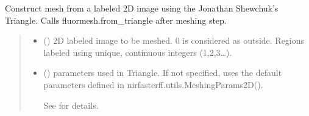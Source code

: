 \documentclass[letterpaper,10pt,english]{sphinxmanual}
\begin{document}
\begin{fulllineitems}
\begin{fulllineitems}
\label{\detokenize{_autosummary/nirfasterff.base.fluor_mesh.fluormesh:nirfasterff.base.fluor_mesh.fluormesh.from_image}}
\pysigstartsignatures
{}
\pysigstopsignatures
\sphinxAtStartPar
Construct mesh from a labeled 2D image using the Jonathan Shewchuk’s Triangle. Calls fluormesh.from\_triangle after meshing step.
\begin{quote}\begin{description}
\begin{itemize}
\item {} 
\sphinxAtStartPar
{} (\sphinxstyleliteralemphasis{\sphinxupquote{ (}}\sphinxstyleliteralemphasis{\sphinxupquote{) }}) \textendash{} 2D labeled image to be meshed. 0 is considered as outside. Regions labeled using unique, continuous integers (1,2,3…).

\item {} 
\sphinxAtStartPar
{} ({\hyperref[\detokenize{_autosummary/nirfasterff.utils.MeshingParams2D:nirfasterff.utils.MeshingParams2D}]{}}\sphinxstyleliteralemphasis{\sphinxupquote{, }}) \textendash{} 
\sphinxAtStartPar
parameters used in Triangle. If not specified, uses the default parameters defined in nirfasterff.utils.MeshingParams2D().

\sphinxAtStartPar
See {\hyperref[\detokenize{_autosummary/nirfasterff.utils.MeshingParams2D:nirfasterff.utils.MeshingParams2D}]{}} for details.



\end{itemize}
\end{description}
\end{quote}
\end{fulllineitems}
\end{fulllineitems}
\end{document}
